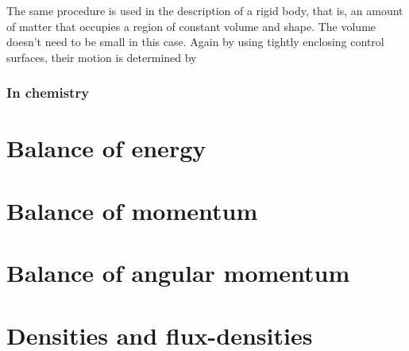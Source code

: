 \documentclass[a4paper,12pt,%
onecolumn,oneside,titlepage,%
british%
]{memoir}
\renewcommand*{\|}[1][]{\nonscript\:#1\vert\nonscript\:\mathopen{}}
\begin{document}
The same procedure is used in the description of a rigid body, that is, an amount of matter that occupies a region of constant volume and shape. The volume doesn't need to be small in this case. Again by using tightly enclosing control surfaces, their motion is determined by 





\subsection{In chemistry}
\label{sec:cons_matter_chemistry}





\printpagenotes*
\clearpage
\chapter{Balance of energy}
\label{cha:bal_energy}

\printpagenotes*
\clearpage
\chapter{Balance of momentum}
\label{cha:bal_momentum}

\printpagenotes*
\clearpage
\chapter{Balance of angular momentum}
\label{cha:bal_ang_momentum}

%





\smallskip


\printpagenotes*
\clearpage
\chapter{Densities and flux-densities}
\label{cha:density_fluxdensity}
\end{document}
